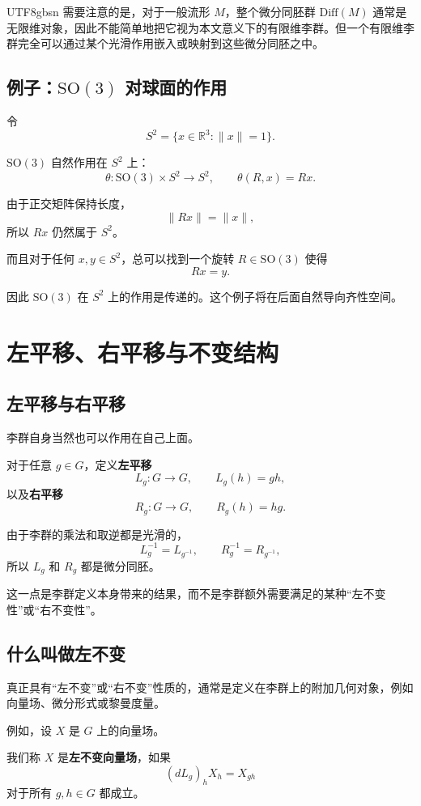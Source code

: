 \documentclass[11pt]{article}
\begin{document}
\begin{CJK*}{UTF8}{gbsn}
需要注意的是，对于一般流形 $M$，整个微分同胚群 $\mathrm{Diff}(M)$ 通常是无限维对象，因此不能简单地把它视为本文意义下的有限维李群。但一个有限维李群完全可以通过某个光滑作用嵌入或映射到这些微分同胚之中。


\subsection{例子：$\mathrm{SO}(3)$ 对球面的作用}

令
\[
S^2
=
\{x\in\mathbb{R}^3:\|x\|=1\}.
\]

$\mathrm{SO}(3)$ 自然作用在 $S^2$ 上：
\[
\theta:\mathrm{SO}(3)\times S^2\to S^2,
\qquad
\theta(R,x)=Rx.
\]

由于正交矩阵保持长度，
\[
\|Rx\|=\|x\|,
\]
所以 $Rx$ 仍然属于 $S^2$。

而且对于任何 $x,y\in S^2$，总可以找到一个旋转 $R\in\mathrm{SO}(3)$ 使得
\[
Rx=y.
\]

因此 $\mathrm{SO}(3)$ 在 $S^2$ 上的作用是传递的。这个例子将在后面自然导向齐性空间。


\section{左平移、右平移与不变结构}

\subsection{左平移与右平移}

李群自身当然也可以作用在自己上面。

对于任意 $g\in G$，定义\textbf{左平移}
\[
L_g:G\to G,
\qquad
L_g(h)=gh,
\]
以及\textbf{右平移}
\[
R_g:G\to G,
\qquad
R_g(h)=hg.
\]

由于李群的乘法和取逆都是光滑的，
\[
L_g^{-1}=L_{g^{-1}},
\qquad
R_g^{-1}=R_{g^{-1}},
\]
所以 $L_g$ 和 $R_g$ 都是微分同胚。

这一点是李群定义本身带来的结果，而不是李群额外需要满足的某种“左不变性”或“右不变性”。


\subsection{什么叫做左不变}

真正具有“左不变”或“右不变”性质的，通常是定义在李群上的附加几何对象，例如向量场、微分形式或黎曼度量。

例如，设 $X$ 是 $G$ 上的向量场。

我们称 $X$ 是\textbf{左不变向量场}，如果
\[
(dL_g)_hX_h
=
X_{gh}
\]
对于所有 $g,h\in G$ 都成立。


\end{CJK*}
\end{document}

